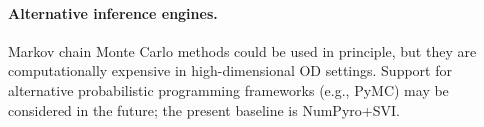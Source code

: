 \paragraph{Alternative inference engines.}
Markov chain Monte Carlo methods could be used in principle, but they are computationally expensive in high-dimensional OD settings.
Support for alternative probabilistic programming frameworks (e.g., PyMC) may be considered in the future; the present baseline is NumPyro+SVI.

